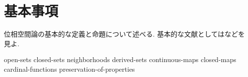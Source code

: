 \documentclass[uplatex, dvipdfmx, a4paper, 12pt, class=jsbook, crop=false]{standalone}
\begin{document}
\chapter{基本事項}
\label{chap:basics}

位相空間論の基本的な定義と命題について述べる.
基本的な文献としては\cite{Engelking1989GT, Dugundji1966T, Morita1981ja, KodamaNagami1974ja}などを見よ.

{open-sets}
{closed-sets}
{neighborhoods}
{derived-sets}
{continuous-maps}
{closed-maps}
{cardinal-functions}
{preservation-of-properties}
\end{document}
